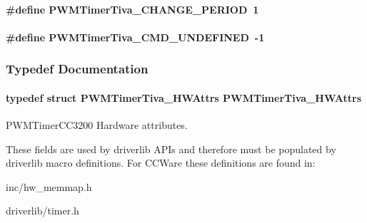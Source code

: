 \paragraph[{P\-W\-M\-Timer\-Tiva\-\_\-\-C\-H\-A\-N\-G\-E\-\_\-\-P\-E\-R\-I\-O\-D}]{\setlength{\rightskip}{0pt plus 5cm}\#define P\-W\-M\-Timer\-Tiva\-\_\-\-C\-H\-A\-N\-G\-E\-\_\-\-P\-E\-R\-I\-O\-D~1}\label{_p_w_m_timer_tiva_8h_ad16a2de6625d6aabef487d2ec63e447c}
\paragraph[{P\-W\-M\-Timer\-Tiva\-\_\-\-C\-M\-D\-\_\-\-U\-N\-D\-E\-F\-I\-N\-E\-D}]{\setlength{\rightskip}{0pt plus 5cm}\#define P\-W\-M\-Timer\-Tiva\-\_\-\-C\-M\-D\-\_\-\-U\-N\-D\-E\-F\-I\-N\-E\-D~-\/1}\label{_p_w_m_timer_tiva_8h_a609b29cb0990238f0610fec043802558}


\subsubsection{Typedef Documentation}
\paragraph[{P\-W\-M\-Timer\-Tiva\-\_\-\-H\-W\-Attrs}]{\setlength{\rightskip}{0pt plus 5cm}typedef struct {\bf P\-W\-M\-Timer\-Tiva\-\_\-\-H\-W\-Attrs}  {\bf P\-W\-M\-Timer\-Tiva\-\_\-\-H\-W\-Attrs}}\label{_p_w_m_timer_tiva_8h_adfca3d3443cb74ff428f0e95e5cceefb}


P\-W\-M\-Timer\-C\-C3200 Hardware attributes. 

These fields are used by driverlib A\-P\-Is and therefore must be populated by driverlib macro definitions. For C\-C\-Ware these definitions are found in\-:
\begin{DoxyItemize}
\item inc/hw\-\_\-memmap.\-h
\item driverlib/timer.\-h
\end{DoxyItemize}

